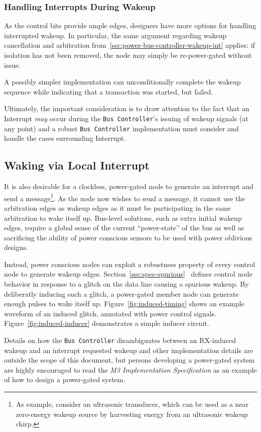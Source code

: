 \subsubsection{Handling Interrupts During Wakeup}
As the control bits provide ample edges, designers have more options for
handling interrupted wakeup. In particular, the same argument regarding wakeup
cancellation and arbitration from~\ref{sec:power-bus-controller-wakeup-int}
applies: if isolation has not been removed, the node may simply be
re-power-gated without issue.

A possibly simpler implementation can unconditionally complete the wakeup
sequence while indicating that a transaction was started, but failed.

Ultimately, the important consideration is to draw attention to the fact that
an Interrupt {\em may} occur during the {\tt Bus~Controller}'s issuing of
wakeup signals (at any point) and a robust {\tt Bus~Controller} implementation
must consider and handle the cases surrounding Interrupt.

\subsection{Waking via Local Interrupt}
It is also desirable for a clockless, power-gated \bus node to generate an
interrupt and send a message\footnote{
  As example, consider an ultrasonic transducer, which can be used as a near
  zero-energy wakeup source by harvesting energy from an ultrasonic wakeup
  chirp.}.
As the node now wishes to send a message, it cannot use the arbitration edges
as wakeup edges as it must be participating in the same arbitration to wake
itself up. Bus-level solutions, such as extra initial wakeup edges, require a
global sense of the current ``power-state'' of the bus as well as sacrificing
the ability of power conscious sensors to be used with power oblivious
designs.

Instead, power conscious nodes can exploit a robustness property of every \bus
control node to generate wakeup edges.
Section~\ref{sec:spec-spurious}~ defines control
node behavior in response to a glitch on the data line causing a spurious
wakeup. By deliberatly inducing such a glitch, a power-gated member node can
generate enough pulses to wake itself up. Figure~\ref{fig:induced-timing}
shows an example waveform of an induced glitch, annotated with power control
signals. Figure~\ref{fig:induced-inducer} demonstrates a simple inducer
circuit.

Details on how the {\tt Bus~Controller} disambiguates between an RX-induced
wakeup and an interrupt requested wakeup and other implementation details are
outside the scope of this document, but persons developing a power-gated
system are highly encouraged to read the {\em \bus M3 Implementation
Specification} as an example of how to design a power-gated system.

\begin{figure}
  \figTimingInducedGlitch
\end{figure}
